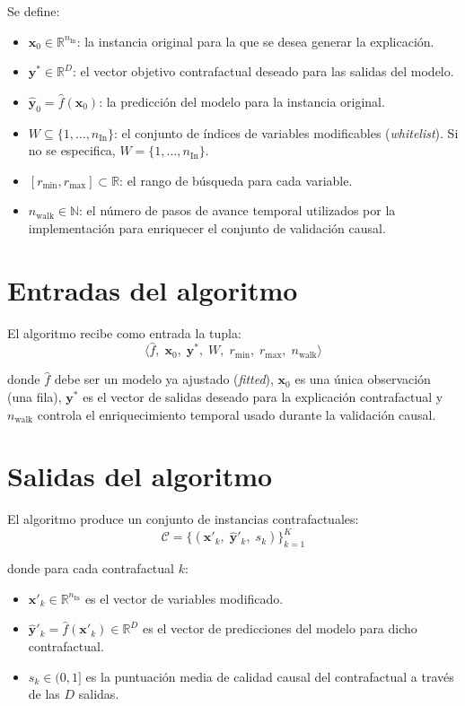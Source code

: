 \documentclass[12pt]{report} %
\begin{document}
Se define:
\begin{itemize}
    \item $\mathbf{x}_0 \in \mathbb{R}^{n_{\text{In}}}$: la instancia original para la que se desea generar la explicación.
    \item $\mathbf{y}^{*} \in \mathbb{R}^{D}$: el vector objetivo contrafactual deseado para las salidas del modelo.
    \item $\hat{\mathbf{y}}_0 = \hat{f}(\mathbf{x}_0)$: la predicción del modelo para la instancia original.
    \item $W \subseteq \{1, \ldots, n_{\text{In}}\}$: el conjunto de índices de variables modificables (\textit{whitelist}). Si no se especifica, $W = \{1, \ldots, n_{\text{In}}\}$.
    \item $[r_{\min}, r_{\max}] \subset \mathbb{R}$: el rango de búsqueda para cada variable.
    \item $n_{\text{walk}} \in \mathbb{N}$: el número de pasos de avance temporal utilizados por la implementación para enriquecer el conjunto de validación causal.
\end{itemize}


\section{Entradas del algoritmo}

El algoritmo recibe como entrada la tupla:
$$\langle \hat{f},\; \mathbf{x}_0,\; \mathbf{y}^{*},\; W,\; r_{\min},\; r_{\max},\; n_{\text{walk}} \rangle$$

donde $\hat{f}$ debe ser un modelo ya ajustado (\textit{fitted}), $\mathbf{x}_0$ es una única observación (una fila), $\mathbf{y}^{*}$ es el vector de salidas deseado para la explicación contrafactual y $n_{\text{walk}}$ controla el enriquecimiento temporal usado durante la validación causal.

\section{Salidas del algoritmo}

El algoritmo produce un conjunto de instancias contrafactuales:
$$\mathcal{C} = \{(\mathbf{x}'_k,\; \hat{\mathbf{y}}'_k,\; s_k)\}_{k=1}^{K}$$

donde para cada contrafactual $k$:
\begin{itemize}
    \item $\mathbf{x}'_k \in \mathbb{R}^{n_{\text{In}}}$ es el vector de variables modificado.
    \item $\hat{\mathbf{y}}'_k = \hat{f}(\mathbf{x}'_k) \in \mathbb{R}^{D}$ es el vector de predicciones del modelo para dicho contrafactual.
    \item $s_k \in (0, 1]$ es la puntuación media de calidad causal del contrafactual a través de las $D$ salidas.
\end{itemize}
\end{document}
